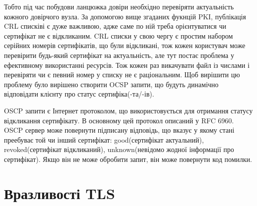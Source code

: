 Тобто під час побудови ланцюжка довіри необхідно перевіряти актуальність кожного довірчого вузла. За допомогою вище згаданих фукнцій PKI, публікація CRL списківі є дуже важливою, адже саме по ній треба орієнтуватися чи сертифікат не є відкликаним. CRL списки у свою чергу є простим набором серійних номерів сертифікатів, що були відкликані, тож кожен користувач може перевірити будь-який сертифікат на актуальність, але тут постає проблема у ефективному використанні ресурсів. Тож кожен раз викачувати файл із числами і перевіряти чи є певний номер у списку не є раціональним. Щоб вирішити цю проблему було вирішено створити OCSP запити, що будуть динамічно відповідати клієнту про статус сертифіка(-та/-ів).


OSCP запити є Інтернет протоколом, що використовується для отримання статусу відкликання сертифікату. В основному цей протокол описаний у RFC 6960. OSCP сервер може повернути підписану відповідь, що вказує у якому стані преебуває той чи інший сертифікат: good(сертифікат актуальний), revoked(сертифікат відкликаний), unknown(невідомо жодної інформації про сертифікат). Якщо він не може обробити запит, він може повернути код помилки.

\section{Вразливості TLS}

